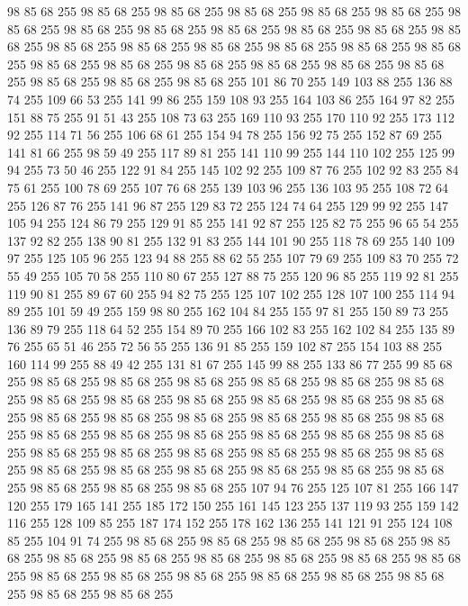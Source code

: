 98 85 68 255 98 85 68 255 98 85 68 255 98 85 68 255 98 85 68 255 98 85 68 255 98 85 68 255 98 85 68 255 98 85 68 255 98 85 68 255 98 85 68 255 98 85 68 255 98 85 68 255 98 85 68 255 98 85 68 255 98 85 68 255 98 85 68 255 98 85 68 255 98 85 68 255 98 85 68 255 98 85 68 255 98 85 68 255 98 85 68 255 98 85 68 255 98 85 68 255 98 85 68 255 98 85 68 255 98 85 68 255 101 86 70 255 149 103 88 255 136 88 74 255 109 66 53 255 141 99 86 255 159 108 93 255 164 103 86 255 164 97 82 255 151 88 75 255 91 51 43 255 108 73 63 255 169 110 93 255 170 110 92 255 173 112 92 255 114 71 56 255 106 68 61 255 154 94 78 255 156 92 75 255 152 87 69 255 141 81 66 255 98 59 49 255 117 89 81 255 141 110 99 255 144 110 102 255 125 99 94 255 73 50 46 255 122 91 84 255 145 102 92 255 109 87 76 255 102 92 83 255 84 75 61 255 100 78 69 255 107 76 68 255 139 103 96 255 136 103 95 255 108 72 64 255
126 87 76 255 141 96 87 255 129 83 72 255 124 74 64 255 129 99 92 255 147 105 94 255 124 86 79 255 129 91 85 255 141 92 87 255 125 82 75 255 96 65 54 255 137 92 82 255 138 90 81 255 132 91 83 255 144 101 90 255 118 78 69 255 140 109 97 255 125 105 96 255 123 94 88 255 88 62 55 255 107 79 69 255 109 83 70 255 72 55 49 255 105 70 58 255 110 80 67 255 127 88 75 255 120 96 85 255 119 92 81 255 119 90 81 255 89 67 60 255 94 82 75 255 125 107 102 255 128 107 100 255 114 94 89 255 101 59 49 255 159 98 80 255 162 104 84 255 155 97 81 255 150 89 73 255 136 89 79 255 118 64 52 255 154 89 70 255 166 102 83 255 162 102 84 255 135 89 76 255 65 51 46 255 72 56 55 255 136 91 85 255 159 102 87 255 154 103 88 255 160 114 99 255 88 49 42 255 131 81 67 255 145 99 88 255 133 86 77 255 99 85 68 255 98 85 68 255 98 85 68 255 98 85 68 255 98 85 68 255 98 85 68 255 98 85 68 255 98 85 68 255 98 85 68 255
98 85 68 255 98 85 68 255 98 85 68 255 98 85 68 255 98 85 68 255 98 85 68 255 98 85 68 255 98 85 68 255 98 85 68 255 98 85 68 255 98 85 68 255 98 85 68 255 98 85 68 255 98 85 68 255 98 85 68 255 98 85 68 255 98 85 68 255 98 85 68 255 98 85 68 255 98 85 68 255 98 85 68 255 98 85 68 255 98 85 68 255 98 85 68 255 98 85 68 255 98 85 68 255 98 85 68 255 98 85 68 255 98 85 68 255 98 85 68 255 98 85 68 255 107 94 76 255 125 107 81 255 166 147 120 255 179 165 141 255 185 172 150 255 161 145 123 255 137 119 93 255 159 142 116 255 128 109 85 255 187 174 152 255 178 162 136 255 141 121 91 255 124 108 85 255 104 91 74 255 98 85 68 255 98 85 68 255 98 85 68 255 98 85 68 255 98 85 68 255 98 85 68 255 98 85 68 255 98 85 68 255 98 85 68 255 98 85 68 255 98 85 68 255 98 85 68 255 98 85 68 255 98 85 68 255 98 85 68 255 98 85 68 255 98 85 68 255 98 85 68 255 98 85 68 255
